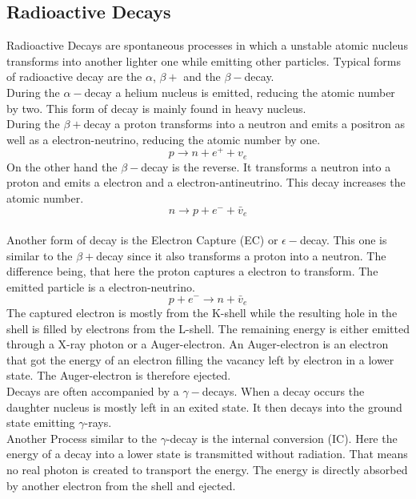\documentclass[30pt,a4paper]{article}
\begin{document}
	\subsection{Radioactive Decays}
	Radioactive Decays are spontaneous processes in which a unstable atomic nucleus transforms into another lighter one while emitting other particles. Typical forms of radioactive decay are the $\alpha$, $\beta+$ and the $\beta-$decay.\\
	During the $\alpha-$decay a helium nucleus is emitted, reducing the atomic number by two. This form of decay is mainly found in heavy nucleus.\\ During the $\beta+$decay a proton transforms into a neutron and emits a positron as well as a electron-neutrino, reducing the atomic number by one.
	$$p\rightarrow n+e^++v_e$$
	On the other hand the $\beta-$decay is the reverse. It transforms a neutron into a proton and emits a electron and a electron-antineutrino. This decay increases the atomic number.
	$$n\rightarrow p+e^-+\bar{v}_e$$\\
	Another form of decay is the Electron Capture (EC) or $\epsilon-$decay. This one is similar to the $\beta+$decay since it also transforms a proton into a neutron. The difference being, that here the proton captures a electron to transform. The emitted particle is a electron-neutrino.
	$$p + e^- \rightarrow n + \bar{v}_e$$
	The captured electron is mostly from the K-shell while the resulting hole in the shell is filled by electrons from the L-shell. The remaining energy is either emitted through a X-ray photon or a Auger-electron. An Auger-electron is an electron that got the energy of an electron filling the vacancy left by electron in a lower state. The Auger-electron is therefore ejected. \\
	Decays are often accompanied by a $\gamma-$decays. When a decay occurs the daughter nucleus is mostly left in an exited state. It then decays into the ground state emitting $\gamma$-rays.\\
	Another Process similar to the $\gamma$-decay is the internal conversion (IC). Here the energy of a decay into a lower state is transmitted without radiation. That means no real photon is created to transport the energy. The energy is directly absorbed by another electron from the shell and ejected.	
\end{document}
